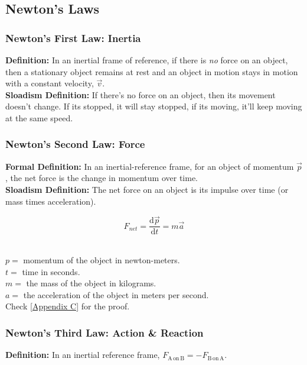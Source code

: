 \documentclass{article}
\begin{document}
\subsection{Newton's Laws}
\subsubsection{Newton's First Law: Inertia}
\textbf{Definition:} In an inertial frame of reference, if there is \textit{no} force on an object, then a stationary object remains at rest and an object in motion stays in motion with a constant velocity, $\vec{v}$. \\

\noindent \textbf{Sloadism Definition:} If there's no force on an object, then its movement doesn't change. If its stopped, it will stay stopped, if its moving, it'll keep moving at the same speed. \\

\subsubsection{Newton's Second Law: Force}
\textbf{Formal Definition:} In an inertial-reference frame, for an object of momentum $\vec{p}$, the net force is the change in momentum over time. \\

\noindent \textbf{Sloadism Definition:} The net force on an object is its impulse over time (or mass times acceleration).

\begin{equation}
    F_{net} = \frac{\mathrm{d}\vec{p}}{\mathrm{d}t} = m\vec{a}
\end{equation} %

 \\
$p = $ momentum of the object in newton-meters. \\
$t = $ time in seconds. \\
$m = $ the mass of the object in kilograms. \\
$a = $ the acceleration of the object in meters per second. \\

\noindent Check \ref{Appendix C} for the proof.

\subsubsection{Newton's Third Law: Action \& Reaction}
\textbf{Definition:} In an inertial reference frame, $F_{\mathrm{A \, on \, B}} = -F_{\mathrm{B \, on \, A}}$. \\
\end{document}
